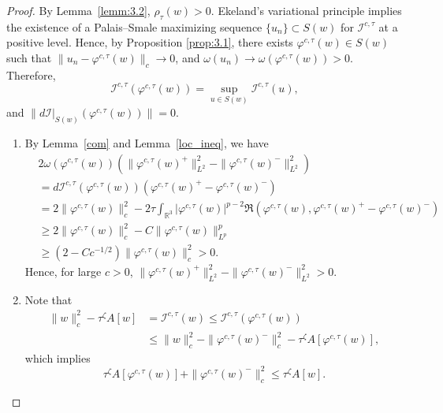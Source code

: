 \documentclass{amsart}
\theoremstyle{plain}
\theoremstyle{definition}
\theoremstyle{remark}
\numberwithin{equation}{section} \numberwithin{figure}{section}
\begin{document}
  \begin{proof}
  By Lemma~\ref{lemm:3.2}, \( \rho_\tau(w) > 0 \). Ekeland's variational principle implies the 
  existence of a Palais–Smale maximizing sequence \( \{u_n\} \subset S(w) \) for \( \mathcal{I}^{c,\tau} \) 
  at a positive level. Hence, by Proposition \ref{prop:3.1}, there exists \( \varphi^{c,\tau}(w) \in S(w) \) such that \( \|u_n - \varphi^{c,\tau}(w)\|_c \to 0 \), and \( \omega(u_n) \to \omega(\varphi^{c,\tau}(w)) > 0 \). Therefore,
  \[
  \mathcal{I}^{c,\tau}(\varphi^{c,\tau}(w)) = \sup_{u \in S(w)} \mathcal{I}^{c,\tau}(u),
  \]
  and \( \| d\mathcal{I}|_{S(w)}(\varphi^{c,\tau}(w)) \| = 0 \).
  
  \begin{enumerate}
    \item[(1)] By Lemma~\ref{com} and Lemma~\ref{loc_ineq}, we have
    \[
    \begin{aligned}
      &2\omega(\varphi^{c,\tau}(w)) \left( \|\varphi^{c,\tau}(w)^+\|_{L^2}^2 - \|\varphi^{c,\tau}(w)^-\|_{L^2}^2 \right) \\
      &= d\mathcal{I}^{c,\tau}(\varphi^{c,\tau}(w))(\varphi^{c,\tau}(w)^+ - \varphi^{c,\tau}(w)^-) \\
      &= 2\|\varphi^{c,\tau}(w)\|_c^2 - 2\tau \int_{\mathbb{R}^3} |\varphi^{c,\tau}(w)|^{p-2} \Re\left( \varphi^{c,\tau}(w), \varphi^{c,\tau}(w)^+ - \varphi^{c,\tau}(w)^- \right) \\
      &\geq 2\|\varphi^{c,\tau}(w)\|_c^2 - C \|\varphi^{c,\tau}(w)\|_{L^p}^p \\
      &\geq (2 - C c^{-1/2}) \|\varphi^{c,\tau}(w)\|_c^2 > 0.
    \end{aligned}
    \]
    Hence, for large \( c > 0 \), \( \|\varphi^{c,\tau}(w)^+\|_{L^2}^2 - \|\varphi^{c,\tau}(w)^-\|_{L^2}^2 > 0 \).
  
    \item[(2)] Note that
    \[
    \begin{aligned}
      \|w\|_c^2 - \tau^{\zeta} A[w] 
      &= \mathcal{I}^{c,\tau}(w) \leq \mathcal{I}^{c,\tau}(\varphi^{c,\tau}(w)) \\
      &\leq \|w\|_c^2 - \|\varphi^{c,\tau}(w)^-\|_c^2 - \tau^\zeta A[\varphi^{c,\tau}(w)],
    \end{aligned}
    \]
    which implies
    \[
    \tau^\zeta A[\varphi^{c,\tau}(w)] + \|\varphi^{c,\tau}(w)^-\|_c^2 \leq \tau^{\zeta} A[w].
    \]
  

\end{enumerate}
\end{proof}
\end{document}

